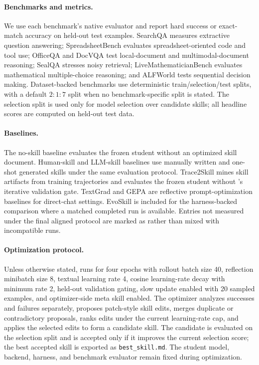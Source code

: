 \paragraph{Benchmarks and metrics.}
We use each benchmark's native evaluator and report hard success or exact-match accuracy on held-out test examples. SearchQA measures extractive question answering; SpreadsheetBench evaluates spreadsheet-oriented code and tool use; OfficeQA and DocVQA test local-document and multimodal-document reasoning; SealQA stresses noisy retrieval; LiveMathematicianBench evaluates mathematical multiple-choice reasoning; and ALFWorld tests sequential decision making. Dataset-backed benchmarks use deterministic train/selection/test splits, with a default $2{:}1{:}7$ split when no benchmark-specific split is stated. The selection split is used only for model selection over candidate skills; all headline scores are computed on held-out test data.

\paragraph{Baselines.}
The no-skill baseline evaluates the frozen student without an optimized skill document. Human-skill and LLM-skill baselines use manually written and one-shot generated skills under the same evaluation protocol. Trace2Skill mines skill artifacts from training trajectories and evaluates the frozen student without \ourmethod{}'s iterative validation gate. TextGrad and GEPA are reflective prompt-optimization baselines for direct-chat settings. EvoSkill is included for the harness-backed comparison where a matched completed run is available. Entries not measured under the final aligned protocol are marked as \na rather than mixed with incompatible runs.

\paragraph{Optimization protocol.}
Unless otherwise stated, \ourmethod{} runs for four epochs with rollout batch size 40, reflection minibatch size 8, textual learning rate 4, cosine learning-rate decay with minimum rate 2, held-out validation gating, slow update enabled with 20 sampled examples, and optimizer-side meta skill enabled. The optimizer analyzes successes and failures separately, proposes patch-style skill edits, merges duplicate or contradictory proposals, ranks edits under the current learning-rate cap, and applies the selected edits to form a candidate skill. The candidate is evaluated on the selection split and is accepted only if it improves the current selection score; the best accepted skill is exported as \texttt{best\_skill.md}. The student model, backend, harness, and benchmark evaluator remain fixed during optimization.

